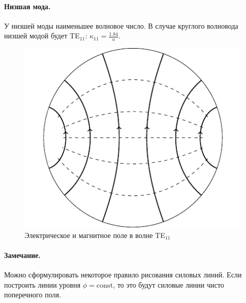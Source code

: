 \paragraph{Низшая мода.} У низшей моды наименьшее волновое число. В случае круглого волновода низшей модой будет TE$_{11}$: $\kappa_{11}=\frac{1.84}{a}$.
\begin{figure}[H]
	\centering
	\includegraphics[scale=1.4]{img_lect5/cylindric/TE11}
	\caption{Электрическое и магнитное поле в волне TE$_{11}$}
	\label{fig:cylinder:TE11}
\end{figure}
\paragraph{Замечание.} Можно сформулировать некоторое правило рисования силовых линий. Если построить линии уровня $\phi=\mathrm{const}$, то это будут силовые линии чисто поперечного поля.

